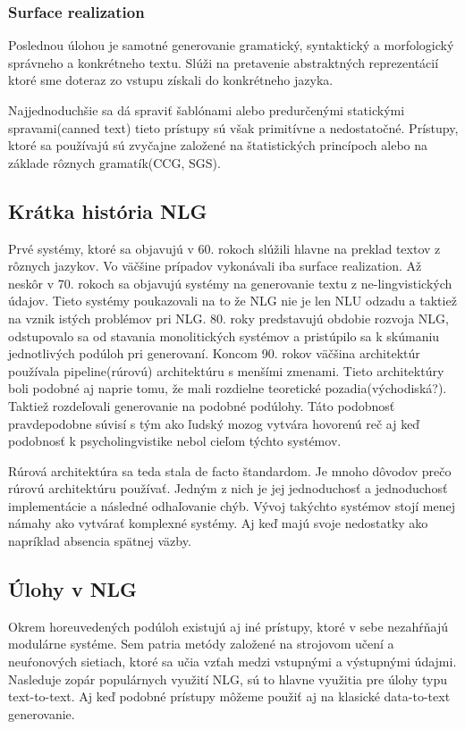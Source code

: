 \subsubsection{Surface realization}
Poslednou úlohou je samotné generovanie gramatický, syntaktický a morfologický správneho a konkrétneho textu. Slúži na pretavenie abstraktných reprezentácií ktoré sme doteraz zo vstupu získali do konkrétneho jazyka\cite{gatt_2018_survey}.

Najjednoduchšie sa dá spraviť šablónami alebo predurčenými statickými spravami(canned text) tieto prístupy sú však primitívne a nedostatočné. Prístupy, ktoré sa používajú sú zvyčajne založené na štatistických princípoch alebo na základe rôznych gramatík(CCG, SGS)\cite{perera_2017_recentnlgadv}.

\subsection{Krátka história NLG}
Prvé systémy, ktoré sa objavujú v 60. rokoch slúžili hlavne na preklad textov z rôznych jazykov. Vo väčšine prípadov vykonávali iba surface realization. Až neskôr v 70. rokoch sa objavujú systémy na generovanie textu z ne-lingvistických údajov. Tieto systémy poukazovali na to že NLG nie je len NLU odzadu a taktiež na vznik istých problémov pri NLG. 80. roky predstavujú obdobie rozvoja NLG, odstupovalo sa od stavania monolitických systémov a pristúpilo sa k skúmaniu jednotlivých podúloh pri generovaní\cite{reiter_dale_2000_buildingnlgsystems}. Koncom 90. rokov väčšina architektúr používala pipeline(rúrovú) architektúru s menšími zmenami. Tieto architektúry boli podobné aj naprie tomu, že mali rozdielne teoretické pozadia(východiská?). Taktiež rozdeľovali generovanie na podobné podúlohy. Táto podobnosť pravdepodobne súvisí s tým ako ľudský mozog vytvára hovorenú reč aj keď podobnosť k psycholingvistike nebol cieľom týchto systémov.

Rúrová architektúra sa teda stala de facto štandardom\cite{reiter_1994_consensusarch}. Je mnoho dôvodov prečo rúrovú architektúru používať. Jedným z nich je jej jednoduchosť a jednoduchosť implementácie a následné odhaľovanie chýb. Vývoj takýchto systémov stojí menej námahy ako vytvárať komplexné systémy. Aj keď majú svoje nedostatky ako napríklad absencia spätnej väzby.

\subsection{Úlohy v NLG}
Okrem horeuvedených podúloh existujú aj iné prístupy, ktoré v sebe nezahŕňajú modulárne systéme. Sem patria metódy založené na strojovom učení a neuŕonových sietiach, ktoré sa učia vzťah medzi vstupnými a výstupnými údajmi. Nasleduje zopár populárnych využití NLG, sú to hlavne využitia pre úlohy typu text-to-text. Aj keď podobné prístupy môžeme použiť aj na klasické data-to-text generovanie\cite{Lapouras_2016_Imitation}.

